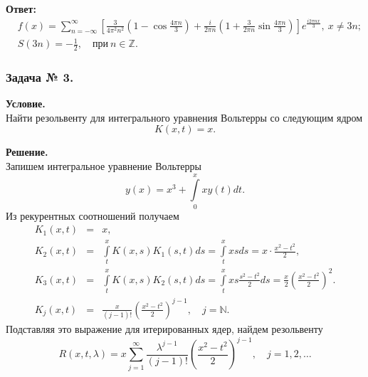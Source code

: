 \noindent
\textbf{Ответ:}
\[
\begin{split}
&f(x)=\sum_{n=-\infty}^\infty\left[ \frac{3}{4\pi^2 n^2}\left(1-\cos{\frac{4\pi n}{3}} \right)+\frac{i}{2\pi n}\left(1+\frac{3}{2\pi n}\sin{\frac{4\pi n}{3}} \right)\right] e^{\tfrac{i2\pi nx}{3}},~ x\ne 3n; \\
&S(3n)=-\frac{1}{2},\quad\text{при}~n\in\mathbb{Z}.
\end{split}
\]


\subsubsection*{\center Задача № 3.}
{\bf Условие.~}\\
Найти резольвенту для интегрального уравнения Вольтерры со следующим ядром 
$$K(x,t)=x.$$

\noindent
{\bf Решение.~}\\
\noindent
Запишем интегральное уравнение Вольтерры
$$
y(x)=x^3+\int\limits_0^x x y(t)dt.
$$
Из рекурентных соотношений получаем
$$
\begin{array}{rcl}
K_1(x,t)&=&\displaystyle x, \\[12pt]
K_2(x,t)&=&\displaystyle\int\limits_t^x K(x,s)K_1(s,t)ds = \int\limits_t^x x s ds = x\cdot\frac{x^2-t^2}{2},\\[12pt]
K_3(x,t)&=&\displaystyle\int\limits_t^x K(x,s)K_2(s,t)ds = \int\limits_t^x x s \frac{s^2-t^2}{2} ds = \frac{x}{2}\left(\frac{x^2-t^2}{2}\right)^2.\\[12pt]
K_j(x,t)&=&\displaystyle\frac{x}{(j-1)!}\left(\frac{x^2-t^2}{2}\right)^{j-1}\!\!\!\!\!\!\!\!,\quad j=\mathbb{N}.
\end{array}
$$
Подставляя это выражение для итерированных ядер, найдем резольвенту
$$ 
R(x,t,\lambda)=x\sum_{j=1}^\infty \frac{\lambda^{j-1}}{(j-1)!}\left(\frac{x^2-t^2}{2}\right)^{j-1}\!\!\!\!\!\!\!\!,
\quad j=1,2,\ldots
$$

